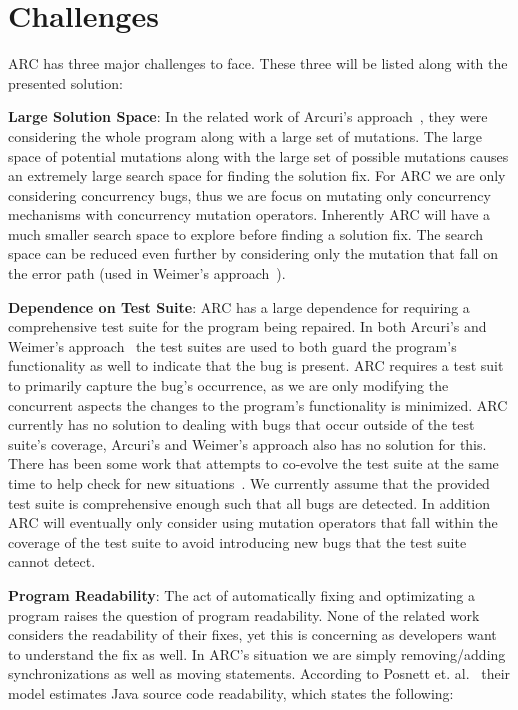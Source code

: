 \documentclass[10pt, conference, compsocconf]{IEEEtran}
\begin{document}
\section{Challenges}
\label{sec:challenges}

ARC has three major challenges to face. These three will be listed along with
the presented solution:

\textbf{Large Solution Space}: In the related work of Arcuri's
approach~\cite{AY08}, they were considering the whole program along with a
large set of mutations. The large space of potential mutations along with the
large set of possible mutations causes an extremely large search space for
finding the solution fix. For ARC we are only considering concurrency bugs,
thus we are focus on mutating only concurrency mechanisms with concurrency
mutation operators. Inherently ARC will have a much smaller search space to
explore before finding a solution fix. The search space can be reduced even
further by considering only the mutation that fall on the error path (used in
Weimer's approach~\cite{GNFW11}).

\textbf{Dependence on Test Suite}: ARC has a large dependence for requiring a
comprehensive test suite for the program being repaired. In both Arcuri's and
Weimer's approach~\cite{AY08,GNFW11} the test suites are used to both guard the
program's functionality as well to indicate that the bug is present. ARC
requires a test suit to primarily capture the bug's occurrence, as we are only
modifying the concurrent aspects the changes to the program's functionality is
minimized. ARC currently has no solution to dealing with bugs that occur
outside of the test suite's coverage, Arcuri's and Weimer's approach also has
no solution for this. There has been some work that attempts to co-evolve the
test suite at the same time to help check for new situations~\cite{WT10}. We
currently assume that the provided test suite is comprehensive enough such that
all bugs are detected. In addition ARC will eventually only consider using
mutation operators that fall within the coverage of the test suite to avoid
introducing new bugs that the test suite cannot detect.

\textbf{Program Readability}: The act of automatically fixing and optimizating
a program raises the question of program readability. None of the related work
considers the readability of their fixes, yet this is concerning as developers
want to understand the fix as well. In ARC's situation we are simply
removing/adding synchronizations as well as moving statements. According to
Posnett et. al.~\cite{PHD11} their model estimates Java source code
readability, which states the following:
\end{document}
